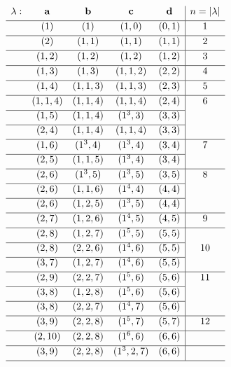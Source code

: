 \documentclass[12pt,reqno]{amsart}
\begin{document}
\begin{theorem}
\begin{table}[H]
    $\begin{array}{ccccc|c}
    \lambda: & \mbfa & \mbfb & \mbfc & \mbfd & n=|\lambda|
    \\[1mm] \hline
    & (1) & (1) & (1,0) & (0, 1) & 1
    \\[1mm] \hline
    & (2) & (1,1) & (1,1) & (1,1) & 2
    \\[1mm] \hline
    & (1,2) & (1,2) & (1,2) & (1,2) & 3
    \\[1mm] \hline
    & (1,3) & (1,3) & (1,1,2) & (2,2) & 4
    \\[1mm] \hline
    & (1,4) & (1,1,3) & (1,1,3) & (2,3) & 5
    \\[1mm] \hline
    & (1,1,4) & (1,1,4) & (1,1,4) & (2,4) & 6
    \\[1mm] \cline{1-5}
    & (1,5) & (1,1,4) & ( 1^3,3) & (3,3) &
    \\[1mm] \cline{1-5}
    & (2,4) & (1,1,4) & (1,1,4) & (3,3) &
    \\[1mm] \hline
    & (1,6) & (1^3,4) & (1^3,4) & (3,4) & 7
    \\[1mm] \cline{1-5}
    & (2,5) & (1,1,5) & (1^3,4) & (3,4) &
    \\[1mm] \hline
    & (2,6) & (1^3,5) & (1^3,5) & (3,5) & 8
    \\[1mm] \cline{1-5}
    & (2,6) & (1,1,6) & (1^4,4) & (4,4) &
    \\[1mm] \cline{1-5}
    & (2,6) & (1,2,5) & (1^3,5) & (4,4)
    \\[1mm] \hline
    & (2,7) & (1,2,6) & (1^4,5) & (4,5) & 9
    \\[1mm] \hline
    & (2,8) & (1,2,7) & (1^5,5) & (5,5)
    \\[1mm] \cline{1-5}
    & (2,8) & (2,2,6) & (1^4,6) & (5,5) & 10
    \\[1mm] \cline{1-5}
    & (3,7) & (1,2,7) & (1^4,6) & (5,5) &
    \\[1mm] \hline
    & (2,9) & (2,2,7) & (1^5,6) & (5,6) & 11
    \\[1mm] \cline{1-5}
    & (3,8) & (1,2,8) & (1^5,6) & (5,6) &
    \\[1mm] \cline{1-5}
    & (3,8) & (2,2,7) & (1^4,7) & (5,6) &
    \\[1mm] \hline
    & (3,9) & (2,2,8) & (1^5,7) & (5,7) & 12
    \\[1mm] \hline
    & (2,10) & (2,2,8) & (1^6,6) & (6,6) &
    \\[1mm] \hline
    & (3,9) & (2,2,8) & (1^3,2,7) & (6,6) &
    \\[1mm] \hline
    \end{array}$
\caption{Dimension vectors $\lambda$ of finite type with $(\lambda|\lambda)=1$: special cases ($|\lambda|\leq 12$)}
\label{list.indecomposables:special}
\end{table}


\end{theorem}
\end{document}
